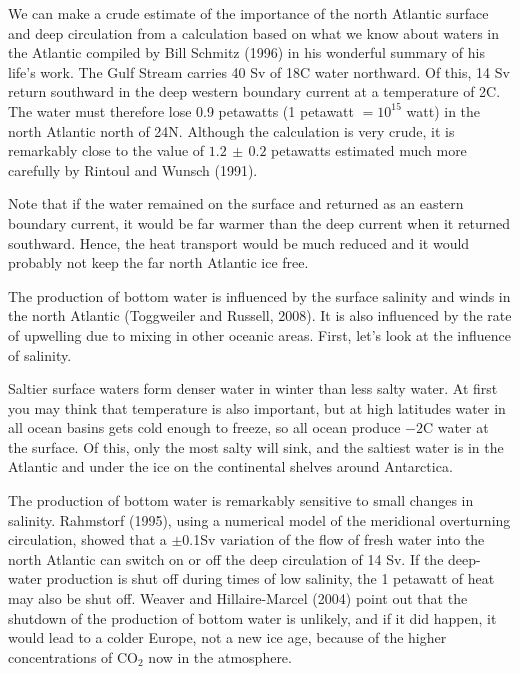 We can make a crude estimate of the importance of the north Atlantic
surface and deep circulation from a calculation based on what we know
about waters in the Atlantic compiled by Bill Schmitz (1996) in his
wonderful summary of his life's work. The Gulf Stream carries 40 Sv of
18\degrees C water northward. Of this, 14 Sv return southward in the
deep western boundary current at a temperature of 2\degrees C. The
water must therefore lose 0.9 petawatts (1 petawatt $= 10^{15} $ watt)
in the north Atlantic north of 24\degrees N. Although the calculation
is very crude, it is remarkably close to the value of $1.2\,\pm\,0.2$
petawatts estimated much more carefully by Rintoul and Wunsch (1991).

Note that if the water remained on the surface and returned as an
eastern boundary current, it would be far warmer than the deep current
when it returned southward. Hence, the heat
transport would be much reduced and it would
probably not keep the far north Atlantic ice free.

The production of bottom water is influenced by
the surface salinity and winds in the north Atlantic (Toggweiler and
Russell, 2008). It is also influenced by the rate of
upwelling due to mixing
in other oceanic areas. First, let's look at the influence of
salinity.

Saltier surface waters form denser water in winter than less salty
water. At first you may think that temperature is also important, but
at high latitudes water in all ocean basins gets cold enough to
freeze, so all ocean produce $-2$\degrees C water at the surface. Of
this, only the most salty will sink, and the saltiest water is in the
Atlantic and under the ice on the continental shelves around
Antarctica.

The production of bottom water is remarkably sensitive to small
changes in salinity. Rahmstorf (1995), using a numerical model of the
meridional over\-turning circulation, showed that a $\pm$0.1Sv variation of the flow of
fresh water into the north Atlantic can switch on or off the deep
circulation of 14 Sv. If the deep-water production is shut off during
times of low salinity, the 1 petawatt of heat may also be shut
off. Weaver and Hillaire-Marcel (2004) point out that the shutdown of
the production of bottom water is unlikely, and if it did happen, it
would lead to a colder Europe, not a new ice age, because of the
higher concentrations of CO$_2$ now in the atmosphere.

